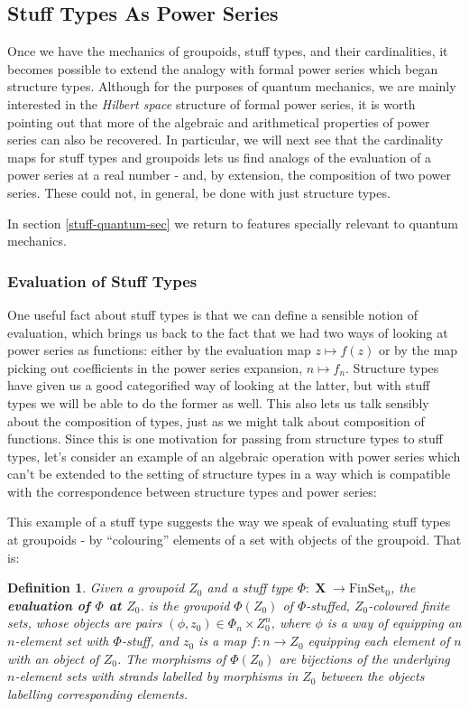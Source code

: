 \documentclass{amsart} \usepackage{amsmath,amssymb,bbm}
\newcommand{\opname}[1]{\operatorname{#1}}
\newtheorem{definition}{Definition}
\newcommand{\catname}[1]{\boldsymbol{\opname{{#1}}}}
\newcommand{\FSN}{\catname{FinSet_0}}
\newcommand{\rightarrowlim}{\mathop{\rightarrow}\limits}
\begin{document}
\subsection{Stuff Types As Power Series}

Once we have the mechanics of groupoids, stuff types, and their
cardinalities, it becomes possible to extend the analogy with formal
power series which began structure types.  Although for the purposes
of quantum mechanics, we are mainly interested in the \textit{Hilbert
space} structure of formal power series, it is worth pointing out that
more of the algebraic and arithmetical properties of power series can
also be recovered.  In particular, we will next see that the
cardinality maps for stuff types and groupoids lets us find analogs of
the evaluation of a power series at a real number - and, by extension,
the composition of two power series.  These could not, in general, be
done with just structure types.

In section \ref{stuff-quantum-sec} we return to features specially
relevant to quantum mechanics.

\subsubsection{Evaluation of Stuff Types}

One useful fact about stuff types is that we can define a sensible
notion of evaluation, which brings us back to the fact that we had two
ways of looking at power series as functions: either by the evaluation
map $z \mapsto f ( z )$ or by the map picking out coefficients in the
power series expansion, $n \mapsto f_n$.  Structure types have given
us a good categorified way of looking at the latter, but with stuff
types we will be able to do the former as well.  This also lets us
talk sensibly about the composition of types, just as we might talk
about composition of functions.  Since this is one motivation for
passing from structure types to stuff types, let's consider an example
of an algebraic operation with power series which can't be extended to
the setting of structure types in a way which is compatible with the
correspondence between structure types and power series:

This example of a stuff type suggests the way we speak of evaluating stuff
types at groupoids - by ``colouring'' elements of a set with objects of the
groupoid.  That is:

\begin{definition}
  Given a groupoid $Z_0$ and a stuff type $\Phi : \catname{X}
  \rightarrow \FSN$, the {\textbf{evaluation of $\Phi$ at $Z_0$}}.  is
  the groupoid $\Phi ( Z_0 )$ of $\Phi$-stuffed, $Z_0$-coloured finite
  sets, whose objects are pairs $( \phi, z_0 ) \in \Phi_n \times
  Z_0^n$, where $\phi$ is a way of equipping an $n$-element set with
  $\Phi$-stuff, and $z_0$ is a map $f : n \rightarrowlim Z_0$
  equipping each element of $n$ with an object of $Z_0$.  The
  morphisms of $\Phi ( Z_0 )$ are bijections of the underlying
  $n$-element sets with strands labelled by morphisms in $Z_0$ between
  the objects labelling corresponding elements.
\end{definition}
\end{document}
